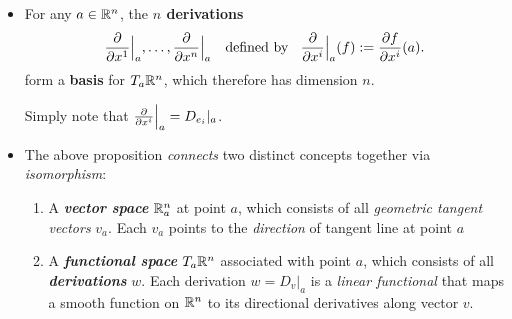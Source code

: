 \documentclass[11pt]{article}
\begin{document}
\begin{itemize}
\begin{proof}
Thus
\begin{align*}
w(f) &= w(f(a)) + \sum_{i}w\paren{\partdiff{f}{x^{i}}(a)(x^i - a^i)}\\
&= 0 +  \sum_{i}\partdiff{f}{x^{i}}(a)(w(x^i) - w(a^i))\\
&= \sum_{i}\partdiff{f}{x^{i}}(a)v^{i} := D_v|_a(f). \qed
\end{align*}
\end{proof}

\item \begin{corollary}\label{coro: basis_tangent_space}
For any $a \in {\mathbb R}^n$, the \textbf{$n$ derivations}
\begin{align}
\frac{\partial }{ \partial x^{1}}\Bigr|_{a}, \ldots, \frac{\partial }{ \partial x^{n}}\Bigr|_{a} \quad\text{defined by }\;\;\frac{\partial }{ \partial x^{i}}\Bigr|_{a}(f) := \frac{\partial f}{ \partial x^{i}}(a).
\end{align} form a \textbf{basis} for $T_{a}{\mathbb R}^n$, which therefore has dimension $n$.
\end{corollary} Simply note that $\frac{\partial }{ \partial x^{i}}\Bigr|_{a} = D_{e_i}|_a$.

\item The above proposition \emph{connects} two distinct concepts together via \emph{isomorphism}:
\begin{enumerate}
\item A \emph{\textbf{vector space}} ${\mathbb R}_{a}^n$ at point $a$, which consists of all \emph{geometric tangent vectors} $v_a$. Each $v_a$ points to the \emph{direction} of tangent line at point $a$
\item A \emph{\textbf{functional space}} $T_{a}{\mathbb R}^{n}$ associated with point $a$, which consists of all \emph{\textbf{derivations}} $w$. Each derivation $w = D_v\big|_{a}$ is a \emph{linear functional} that maps a smooth function on ${\mathbb R}^{n}$ to its directional derivatives along vector $v$.
\end{enumerate}

\end{itemize}
\end{document}
